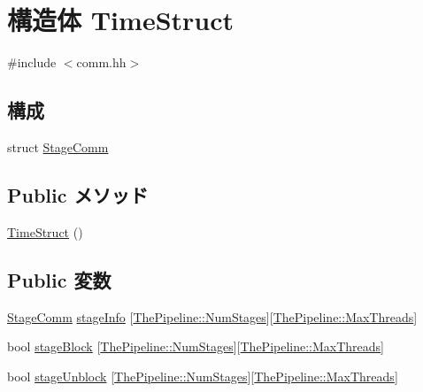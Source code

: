 \hypertarget{structTimeStruct}{
\section{構造体 TimeStruct}
\label{structTimeStruct}
}


{\ttfamily \#include $<$comm.hh$>$}\subsection*{構成}
\begin{DoxyCompactItemize}
\item 
struct \hyperlink{structTimeStruct_1_1StageComm}{StageComm}
\end{DoxyCompactItemize}
\subsection*{Public メソッド}
\begin{DoxyCompactItemize}
\item 
\hyperlink{structTimeStruct_ac60509ddefb1896ba472e03709928dda}{TimeStruct} ()
\end{DoxyCompactItemize}
\subsection*{Public 変数}
\begin{DoxyCompactItemize}
\item 
\hyperlink{structTimeStruct_1_1StageComm}{StageComm} \hyperlink{structTimeStruct_ada7f35cbafe48bd5f738dcb0dc017cc2}{stageInfo} \mbox{[}\hyperlink{namespaceThePipeline_a6918d1731267e5f56969bfb5c240be85}{ThePipeline::NumStages}\mbox{]}\mbox{[}\hyperlink{namespaceThePipeline_ac9c0bbe9cf27d93e08ea8ccc4096e633}{ThePipeline::MaxThreads}\mbox{]}
\item 
bool \hyperlink{structTimeStruct_ae069373288f1db6733df453a1bced9fe}{stageBlock} \mbox{[}\hyperlink{namespaceThePipeline_a6918d1731267e5f56969bfb5c240be85}{ThePipeline::NumStages}\mbox{]}\mbox{[}\hyperlink{namespaceThePipeline_ac9c0bbe9cf27d93e08ea8ccc4096e633}{ThePipeline::MaxThreads}\mbox{]}
\item 
bool \hyperlink{structTimeStruct_ac034ecec18e28c5cc261ce877e429418}{stageUnblock} \mbox{[}\hyperlink{namespaceThePipeline_a6918d1731267e5f56969bfb5c240be85}{ThePipeline::NumStages}\mbox{]}\mbox{[}\hyperlink{namespaceThePipeline_ac9c0bbe9cf27d93e08ea8ccc4096e633}{ThePipeline::MaxThreads}\mbox{]}
\end{DoxyCompactItemize}


